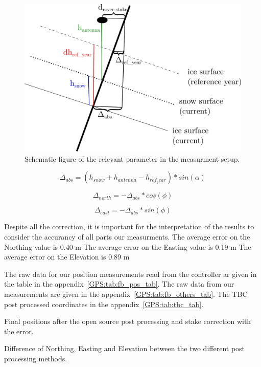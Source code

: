 \begin{figure}
\centering
\includegraphics[width=\linewidth]{./figs/pictures/schematic_setup.pdf}
\caption{Schematic figure of the relevant parameter in the measurment setup.}
\end{figure}


\begin{equation}
	\Delta_{abs} = (h_{snow} + h_{antenna} - h_{ref_year}) * sin(\alpha)
\end{equation}

\begin{equation}
	\Delta_{north} = - \Delta_{abs} * cos(\phi)
\end{equation}

\begin{equation}
	\Delta_{east} = - \Delta_{abs} * sin(\phi)
\end{equation}

Despite all the correction, it is important for the interpretation of the results to consider the accurancy of all parts our measurments.
The average error on the Northing value is 0.40 m  
The average error on the Easting value is 0.19 m
The average error on the Elevation is 0.89 m

The raw data for our position measurements read from the controller ar given in the table in the appendix~\ref{GPS:tab:fb_pos_tab}.
The raw data from our measurements are given in the appendix~\ref{GPS:tab:fb_others_tab}. 
The TBC post processed coordinates in the appendix~\ref{GPS:tab:tbc_tab}.

\begin{table}[h]
\caption{Final positions after the open source post processing and stake correction with the error.}
\centering

\label{GPS:tab:os_tab}
\end{table}


\begin{table}[h]
\caption{Difference of Northing, Easting and Elevation between the two different post processing methods.}
\centering

\label{GPS:tab:diff_tab}
\end{table}


